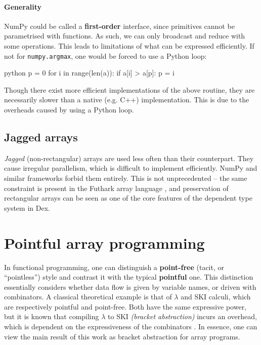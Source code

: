 \paragraph{Generality} NumPy could be called a \textbf{first-order} interface, since primitives cannot be parametrised with functions. As such, we can only broadcast and reduce with some operations. This leads to limitations of what can be expressed efficiently. If not for \texttt{numpy.argmax}, one would be forced to use a Python loop:
\begin{center}
\begin{cminted}{python}
p = 0
for i in range(len(a)): 
    if a[i] > a[p]: p = i
\end{cminted}
\end{center}
Though there exist more efficient implementations of the above routine, they are necessarily slower than a native (e.g. C++) implementation. This is due to the overheads caused by using a Python loop.

\subsection{Jagged arrays}

\textit{Jagged} (non-rectangular) arrays are used less often than their counterpart. They cause irregular parallelism, which is difficult to implement efficiently. NumPy and similar frameworks forbid them entirely. This is not unprecedented -- the same constraint is present in the Futhark array language \cite{henriksen2017futhark}, and preservation of rectangular arrays can be seen as one of the core features of the dependent type system in Dex.

\section{Pointful array programming}

In functional programming, one can distinguish a \textbf{point-free} (tacit, or ``pointless'') style and contrast it with the typical \textbf{pointful} one. This distinction essentially considers whether data flow is given by variable names, or driven with combinators. A classical theoretical example is that of $\lambda$ and SKI calculi, which are respectively pointful and point-free. Both have the same expressive power, but it is known that compiling $\lambda$ to SKI \textit{(bracket abstraction)} incurs an overhead, which is dependent on the expressiveness of the combinators \cite{lachowski2018complexity}. 
In essence, one can view the main result of this work as bracket abstraction for array programs.

